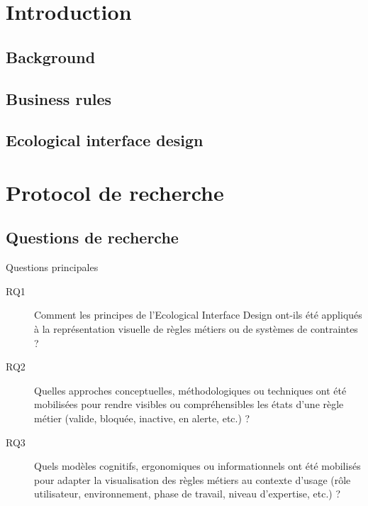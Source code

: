 \documentclass[11pt]{article}
\author{PA156562}
\date{\today}
\title{}
\begin{document}
\tableofcontents

\section{Introduction}
\label{sec:org6dbc753}

\subsection{Background}
\label{sec:orgcf4b5a5}
\subsection{Business rules}
\label{sec:orgc1ae20d}

\subsection{Ecological interface design}
\label{sec:org161dbf9}
\section{Protocol de recherche}
\label{sec:org74f7c68}
\subsection{Questions de recherche}
\label{sec:org8993bea}
Questions principales
\begin{description}
\item[{\label{orgb3cdbf5}RQ1}] Comment les principes de l’Ecological Interface Design ont-ils été appliqués à la représentation visuelle de règles métiers ou de systèmes de contraintes ?
\item[{\label{orga5f2884}RQ2}] Quelles approches conceptuelles, méthodologiques ou techniques ont été mobilisées pour rendre visibles ou compréhensibles les états d’une règle métier (valide, bloquée, inactive, en alerte, etc.) ?
\item[{\label{org552f46f}RQ3}] Quels modèles cognitifs, ergonomiques ou informationnels ont été mobilisés pour adapter la visualisation des règles métiers au contexte d’usage (rôle utilisateur, environnement, phase de travail, niveau d’expertise, etc.) ?
\end{description}
\end{document}
